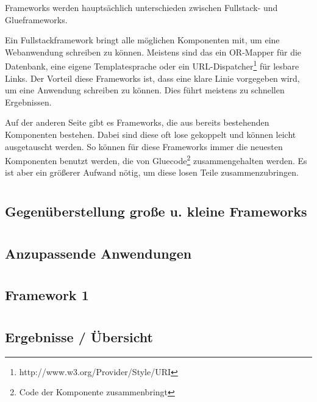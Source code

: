 \documentclass[titlepage, 12pt,a4paper]{scrreprt}
\begin{document}
Frameworks werden hauptsächlich unterschieden zwischen Fullstack- und
Glueframeworks.

Ein Fullstackframework bringt alle möglichen Komponenten mit,
um eine Webanwendung schreiben zu können. Meistens sind das ein OR-Mapper für
die Datenbank, eine eigene Templatesprache oder ein
URL-Dispatcher\footnote{http://www.w3.org/Provider/Style/URI} für lesbare Links. Der Vorteil diese Frameworks ist, dass eine klare Linie vorgegeben wird,
um eine Anwendung schreiben zu können. Dies führt meistens zu schnellen
Ergebnissen. 

Auf der anderen Seite gibt es Frameworks, die aus bereits bestehenden
Komponenten bestehen. Dabei sind diese oft lose gekoppelt und können leicht
ausgetauscht werden. So können für diese Frameworks immer die neuesten
Komponenten benutzt werden, die von Gluecode\footnote{Code der Komponente
zusammenbringt} zusammengehalten werden. Es ist aber ein größerer Aufwand nötig,
um diese losen Teile zusammenzubringen. 

 
\chapter{}
\section{Gegenüberstellung große u. kleine Frameworks}
\chapter{}
\section{Anzupassende Anwendungen}
\chapter{}
\section{Framework 1}
\chapter{}
\section{Ergebnisse / Übersicht }
\end{document}
